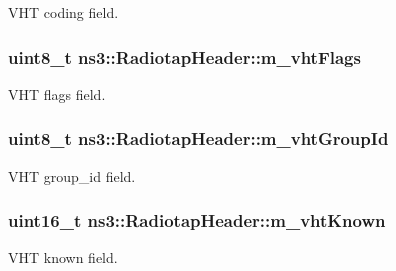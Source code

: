 V\+HT coding field. 

\subsubsection[{\texorpdfstring{m\+\_\+vht\+Flags}{m_vhtFlags}}]{\setlength{\rightskip}{0pt plus 5cm}uint8\+\_\+t ns3\+::\+Radiotap\+Header\+::m\+\_\+vht\+Flags\hspace{0.3cm}{\ttfamily [private]}}\hypertarget{classns3_1_1RadiotapHeader_ae1f2319399552e40d53d888516bf7445}{}\label{classns3_1_1RadiotapHeader_ae1f2319399552e40d53d888516bf7445}


V\+HT flags field. 

\subsubsection[{\texorpdfstring{m\+\_\+vht\+Group\+Id}{m_vhtGroupId}}]{\setlength{\rightskip}{0pt plus 5cm}uint8\+\_\+t ns3\+::\+Radiotap\+Header\+::m\+\_\+vht\+Group\+Id\hspace{0.3cm}{\ttfamily [private]}}\hypertarget{classns3_1_1RadiotapHeader_a17096a7c0cea398b1a80a1789b6fcd6f}{}\label{classns3_1_1RadiotapHeader_a17096a7c0cea398b1a80a1789b6fcd6f}


V\+HT group\+\_\+id field. 

\subsubsection[{\texorpdfstring{m\+\_\+vht\+Known}{m_vhtKnown}}]{\setlength{\rightskip}{0pt plus 5cm}uint16\+\_\+t ns3\+::\+Radiotap\+Header\+::m\+\_\+vht\+Known\hspace{0.3cm}{\ttfamily [private]}}\hypertarget{classns3_1_1RadiotapHeader_ae0560a9f80ce1e8693a88ba3a233e09d}{}\label{classns3_1_1RadiotapHeader_ae0560a9f80ce1e8693a88ba3a233e09d}


V\+HT known field. 

